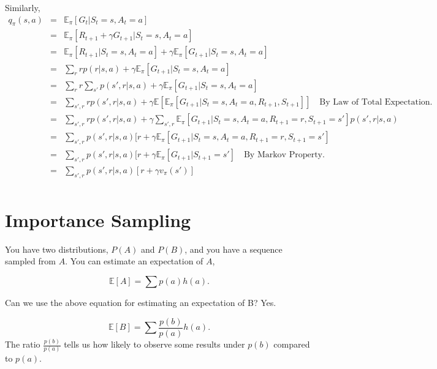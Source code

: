 \begin{appendices}
Similarly,
\begin{eqnarray*}
q_\pi(s,a) &=& \mathbb{E}_\pi[G_t|S_t=s,A_t=a]\\
&=&\mathbb{E}_\pi[R_{t+1} + \gamma G_{t+1}|S_t=s,A_t=a]\\
&=&\mathbb{E}_\pi[R_{t+1}|S_t=s,A_t=a] + \gamma\mathbb{E}_\pi[G_{t+1}|S_t=s,A_t=a]\\
&=&\sum_r rp(r|s,a) + \gamma\mathbb{E}_\pi[G_{t+1}|S_t=s,A_t=a]\\
&=&\sum_r r\sum_{s'}p(s',r|s,a) + \gamma\mathbb{E}_\pi[G_{t+1}|S_t=s,A_t=a]\\
&=&\sum_{s',r}rp(s',r|s,a) + \gamma\mathbb{E}[\mathbb{E}_\pi[G_{t+1}|S_t=s,A_t=a,R_{t+1},S_{t+1}]] \quad \text{By Law of Total Expectation.}\\
&=&\sum_{s',r} rp(s',r|s,a) + \gamma\sum_{s',r}\mathbb{E}_\pi[G_{t+1}|S_t=s,A_t=a,R_{t+1}=r,S_{t+1}=s']p(s',r|s,a)\\
&=&\sum_{s',r} p(s',r|s,a)[r + \gamma\mathbb{E}_\pi[G_{t+1}|S_t=s,A_t=a,R_{t+1}=r,S_{t+1}=s']\\
	&=&\sum_{s',r} p(s',r|s,a)[r + \gamma\mathbb{E}_\pi[G_{t+1}|S_{t+1}=s'] \quad \text{By Markov Property.}\\
&=&\sum_{s',r} p(s',r|s,a)[r + \gamma v_\pi(s')]\\
\end{eqnarray*}

\section{Importance Sampling}
You have two distributions, $P(A)$ and $P(B)$, and you have a sequence sampled from $A$. You can estimate an expectation of $A$, 

$$\mathbb{E}[A] = \sum p(a)h(a).$$

Can we use the above equation for estimating an expectation of B? Yes.

$$\mathbb{E}[B] = \sum \frac{p(b)}{p(a)}h(a).$$
The ratio $\frac{p(b)}{p(a)}$ tells us how likely to observe some results under $p(b)$ compared to $p(a)$.




\end{appendices}

